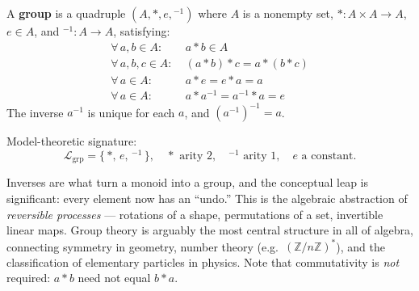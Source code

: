 \begin{definition}[Group]
  A \textbf{group} is a quadruple $(A, *, e, {}^{-1})$ where $A$ is a nonempty
  set, $* : A \times A \to A$, $e \in A$, and ${}^{-1} : A \to A$, satisfying:
  \begin{align*}
    \forall\,a,b \in A:&\; a * b \in A \tag{Closure}\\
    \forall\,a,b,c \in A:&\; (a*b)*c = a*(b*c) \tag{Associativity}\\
    \forall\,a \in A:&\; a * e = e * a = a \tag{Identity}\\
    \forall\,a \in A:&\; a * a^{-1} = a^{-1} * a = e \tag{Inverses}
  \end{align*}
  The inverse $a^{-1}$ is unique for each $a$, and $(a^{-1})^{-1} = a$.

  \medskip\noindent
  Model-theoretic signature:
  \[
    \mathcal{L}_{\mathrm{grp}} = \{\,*,\, e,\, {}^{-1}\,\},
    \quad * \text{ arity } 2,\quad {}^{-1} \text{ arity } 1,\quad
    e \text{ a constant.}
  \]
\end{definition}

\begin{remark}
  Inverses are what turn a monoid into a group, and the conceptual leap is
  significant: every element now has an ``undo.''  This is the algebraic
  abstraction of \emph{reversible processes} — rotations of a shape,
  permutations of a set, invertible linear maps.  Group theory is arguably the
  most central structure in all of algebra, connecting symmetry in geometry,
  number theory (e.g.\ $(\mathbb{Z}/n\mathbb{Z})^*$), and the classification of
  elementary particles in physics.  Note that commutativity is \emph{not}
  required: $a * b$ need not equal $b * a$.
\end{remark}



\clearpage\thispagestyle{plain}

